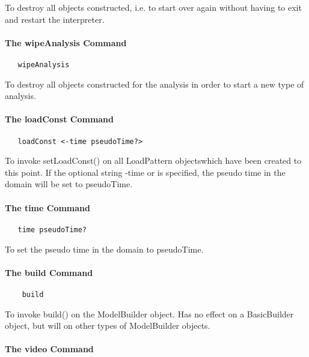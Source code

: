 \documentclass[12pt]{article}
\begin{document}
\noindent To destroy all objects constructed, i.e. to start over again
without having to exit and restart the interpreter.

\paragraph {The wipeAnalysis Command}

{\sf\small
\begin{verbatim}
   wipeAnalysis
\end{verbatim}
}

\noindent To destroy all objects constructed for the analysis in order
to start a new type of analysis.

\paragraph {The loadConst Command}

{\sf\small
\begin{verbatim}
   loadConst <-time pseudoTime?>
\end{verbatim}
}

\noindent To invoke setLoadConst() on all LoadPattern objectswhich
have been created to this point. If the optional string -time or
is specified, the pseudo time in the domain will be set to pseudoTime.

\paragraph {The time Command}

{\sf\small
\begin{verbatim}
   time pseudoTime?
\end{verbatim}
}

\noindent To set the pseudo time in the domain to pseudoTime.

\paragraph {The build Command}

{\sf\small
\begin{verbatim}
    build
\end{verbatim}
}

\noindent To invoke build() on the ModelBuilder object. Has no effect
on a BasicBuilder object, but will on other types of ModelBuilder objects.

\paragraph {The video Command}
\end{document}
